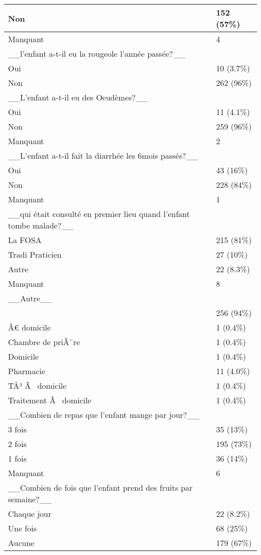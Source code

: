 \documentclass[
]{book}
\begin{document}
\begin{tabular}{l|l}
\hline
Non & 152 (57\%)\\
\hline
Manquant & 4\\
\hline
\_\_l'enfant a-t-il eu la rougeole l'année passée?\_\_ & \\
\hline
Oui & 10 (3.7\%)\\
\hline
Non & 262 (96\%)\\
\hline
\_\_L'enfant a-t-il eu des Oeudèmes?\_\_ & \\
\hline
Oui & 11 (4.1\%)\\
\hline
Non & 259 (96\%)\\
\hline
Manquant & 2\\
\hline
\_\_L'enfant a-t-il fait la diarrhée les 6mois passés?\_\_ & \\
\hline
Oui & 43 (16\%)\\
\hline
Non & 228 (84\%)\\
\hline
Manquant & 1\\
\hline
\_\_qui était consulté en premier lieu quand l'enfant tombe malade?\_\_ & \\
\hline
La FOSA & 215 (81\%)\\
\hline
Tradi Praticien & 27 (10\%)\\
\hline
Autre & 22 (8.3\%)\\
\hline
Manquant & 8\\
\hline
\_\_Autre\_\_ & \\
\hline
 & 256 (94\%)\\
\hline
Ã€ domicile & 1 (0.4\%)\\
\hline
Chambre de priÃ¨re & 1 (0.4\%)\\
\hline
Domicile & 1 (0.4\%)\\
\hline
Pharmacie & 11 (4.0\%)\\
\hline
TÂ³ Ã  domicile & 1 (0.4\%)\\
\hline
Traitement Ã  domicile & 1 (0.4\%)\\
\hline
\_\_Combien de repas que l'enfant mange par jour?\_\_ & \\
\hline
3 fois & 35 (13\%)\\
\hline
2 fois & 195 (73\%)\\
\hline
1 fois & 36 (14\%)\\
\hline
Manquant & 6\\
\hline
\_\_Combien de fois que l'enfant prend des fruits par semaine?\_\_ & \\
\hline
Chaque jour & 22 (8.2\%)\\
\hline
Une fois & 68 (25\%)\\
\hline
Aucune & 179 (67\%)\\

\end{tabular}
\end{document}
